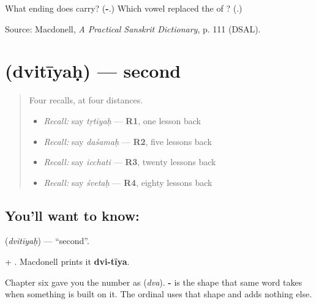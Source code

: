 \begin{tcolorbox}[breakable,colback=teal!4,colframe=teal!35!black,title={Before you move on}]
What ending does \textbf{} carry? (\textbf{-}.) Which vowel replaced the \textbf{} of \textbf{}? (\textbf{}.)

Source: Macdonell, \emph{A Practical Sanskrit Dictionary}, p. 111 (DSAL).
\end{tcolorbox}
\section[\texorpdfstring{\sk{द्वितीयः} (dvitīyaḥ)}{द्वितीयः (dvitīyaḥ)}]{ (dvitīyaḥ) — second}

\label{lesson:SA-C63-second}



\begin{quote}
Four recalls, at four distances.

\begin{itemize}
\raggedright
  \item \emph{Recall:} say \emph{tṛtīyaḥ} — \textbf{R1}, one lesson back
  \item \emph{Recall:} say \emph{daśamaḥ} — \textbf{R2}, five lessons back
  \item \emph{Recall:} say \emph{icchati} — \textbf{R3}, twenty lessons back
  \item \emph{Recall:} say \emph{śvetaḥ} — \textbf{R4}, eighty lessons back
\end{itemize}
\end{quote}

\subsection*{You'll want to know: }
\textbf{} (\emph{dvitīyaḥ}) — \textquotedblleft{}second\textquotedblright{}.

\textbf{} + \textbf{}. Macdonell prints it \textbf{dvi-tīya}.

Chapter six gave you the number as \textbf{} (\emph{dva}). \textbf{-} is the shape that same word takes when something is built on it. The ordinal uses that shape and adds nothing else.

